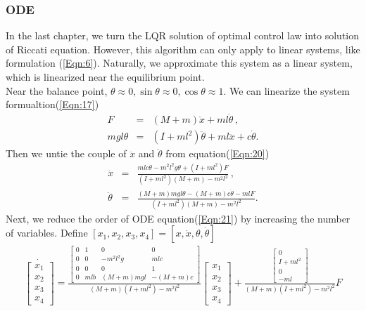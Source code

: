 \documentclass[a4paper,11pt]{article}
\begin{document}
\subsubsection{ODE}
In the last chapter, we turn the LQR solution of optimal control law into solution of Riccati equation. However, this algorithm can only apply
to linear systems, like formulation (\ref{Eqn:6}). Naturally, we approximate this system as a linear system, which is linearized near the equilibrium point.
\\
Near the balance point, $\theta \approx 0, \sin{\theta} \approx 0, \cos{\theta} \approx 1$. We can linearize the system formualtion(\ref{Eqn:17})
\begin{eqnarray}
	F &=& (M+m)\ddot{x} + ml\ddot{\theta} \, , \nonumber \\ 
	mgl\theta &=& (I+ml^2)\ddot{\theta} + ml\ddot{x} + c\dot{\theta}. \label{Eqn:20}
\end{eqnarray} 
Then we untie the couple of $\ddot{x}$ and $\ddot{\theta}$ from equation(\ref{Eqn:20})
\begin{eqnarray}
\ddot{x} &=& \frac{mlc\dot{\theta} -m^2l^2g\theta + (I+ml^2)F}   {(I+ml^2)(M+m) - m^2l^2} \, , \nonumber \\ 
\ddot{\theta} &=& \frac{(M+m)mgl\theta -(M+m)c\dot{\theta}-mlF}   {(I+ml^2)(M+m) - m^2l^2}. \label{Eqn:21}
\end{eqnarray}
Next, we reduce the order of ODE equation(\ref{Eqn:21}) by increasing the number of variables. Define $ [x_1,x_2,x_3,x_4] = [x,\dot x,\theta, \dot \theta]$
\begin{eqnarray}
	\dot{\begin{bmatrix}
		x_1 \\
		x_2 \\
		x_3 \\
		x_4
		\end{bmatrix}} 
		=
		\frac{\begin{bmatrix}
		 0 & 1 & 0 & 0\\
		 0 & 0 & -m^2l^2g & mlc\\
		 0 & 0 & 0 & 1\\
		 0 & mlb & (M+m)mgl & -(M+m)c
		\end{bmatrix}}{(M+m)(I+ml^2)-m^2l^2}
		\begin{bmatrix}
		x_1 \\
		x_2 \\
		x_3 \\
		x_4
		\end{bmatrix}
		+\frac{\begin{bmatrix}
		0 \\
		I+ml^2 \\
		0 \\
		-ml
		\end{bmatrix}}{(M+m)(I+ml^2)-m^2l^2}F \label{Eqn:22} 
\end{eqnarray}
\end{document}
